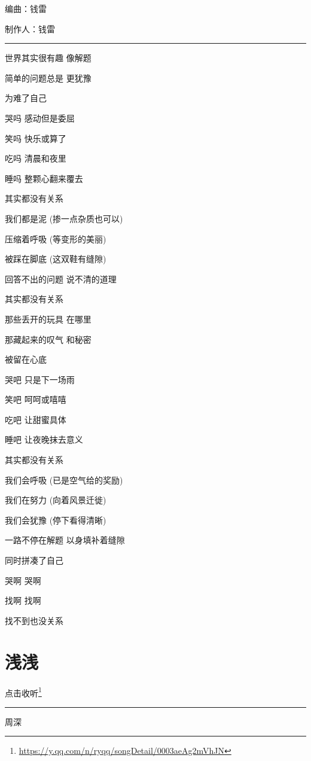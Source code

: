 \documentclass[]{ctexbook}
\renewcommand{\href}[2]{#2\footnote{\url{#1}}}
\begin{document}
编曲：钱雷

制作人：钱雷

\begin{center}\rule{0.5\linewidth}{0.5pt}\end{center}

世界其实很有趣 像解题

简单的问题总是 更犹豫

为难了自己

哭吗 感动但是委屈

笑吗 快乐或算了

吃吗 清晨和夜里

睡吗 整颗心翻来覆去

其实都没有关系

我们都是泥 (掺一点杂质也可以)

压缩着呼吸 (等变形的美丽)

被踩在脚底 (这双鞋有缝隙)

回答不出的问题 说不清的道理

其实都没有关系

那些丢开的玩具 在哪里

那藏起来的叹气 和秘密

被留在心底

哭吧 只是下一场雨

笑吧 呵呵或嘻嘻

吃吧 让甜蜜具体

睡吧 让夜晚抹去意义

其实都没有关系

我们会呼吸 (已是空气给的奖励)

我们在努力 (向着风景迁徙)

我们会犹豫 (停下看得清晰)

一路不停在解题 以身填补着缝隙

同时拼凑了自己

哭啊 哭啊

找啊 找啊

找不到也没关系

\section*{浅浅}\label{qianqian}


\href{https://y.qq.com/n/ryqq/songDetail/0003aeAg2mVhJN}{点击收听}

\begin{center}\rule{0.5\linewidth}{0.5pt}\end{center}

周深
\end{document}
